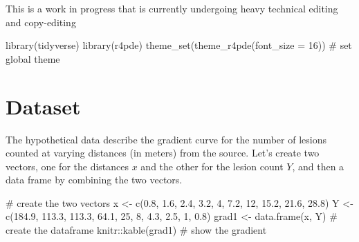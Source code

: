 \documentclass[
  letterpaper,
]{book}
\newenvironment{Shaded}{\begin{snugshade}}{\end{snugshade}}
\newcommand{\AttributeTok}[1]{\textcolor[rgb]{0.40,0.45,0.13}{#1}}
\newcommand{\CommentTok}[1]{\textcolor[rgb]{0.37,0.37,0.37}{#1}}
\newcommand{\DecValTok}[1]{\textcolor[rgb]{0.68,0.00,0.00}{#1}}
\newcommand{\FloatTok}[1]{\textcolor[rgb]{0.68,0.00,0.00}{#1}}
\newcommand{\FunctionTok}[1]{\textcolor[rgb]{0.28,0.35,0.67}{#1}}
\newcommand{\NormalTok}[1]{\textcolor[rgb]{0.00,0.23,0.31}{#1}}
\newcommand{\OtherTok}[1]{\textcolor[rgb]{0.00,0.23,0.31}{#1}}
\newcommand{\SpecialCharTok}[1]{\textcolor[rgb]{0.37,0.37,0.37}{#1}}
\begin{document}
\begin{tcolorbox}[enhanced jigsaw, bottomrule=.15mm, toprule=.15mm, breakable, arc=.35mm, rightrule=.15mm, leftrule=.75mm, colback=white, left=2mm, colframe=quarto-callout-note-color-frame, opacityback=0]
\begin{minipage}[t]{5.5mm}
\textcolor{quarto-callout-note-color}{\faInfo}
\end{minipage}%
\begin{minipage}[t]{\textwidth - 5.5mm}

This is a work in progress that is currently undergoing heavy technical
editing and copy-editing

\end{minipage}%
\end{tcolorbox}

\begin{Shaded}
\begin{Highlighting}[]
\FunctionTok{library}\NormalTok{(tidyverse)}
\FunctionTok{library}\NormalTok{(r4pde)}
\FunctionTok{theme\_set}\NormalTok{(}\FunctionTok{theme\_r4pde}\NormalTok{(}\AttributeTok{font\_size =} \DecValTok{16}\NormalTok{)) }\CommentTok{\# set global theme}
\end{Highlighting}
\end{Shaded}

\hypertarget{dataset}{%
\section{Dataset}\label{dataset}}

The hypothetical data describe the gradient curve for the number of
lesions counted at varying distances (in meters) from the source. Let's
create two vectors, one for the distances \(x\) and the other for the
lesion count \(Y\), and then a data frame by combining the two vectors.

\begin{Shaded}
\begin{Highlighting}[]
\CommentTok{\# create the two vectors}
\NormalTok{x }\OtherTok{\textless{}{-}} \FunctionTok{c}\NormalTok{(}\FloatTok{0.8}\NormalTok{, }\FloatTok{1.6}\NormalTok{, }\FloatTok{2.4}\NormalTok{, }\FloatTok{3.2}\NormalTok{, }\DecValTok{4}\NormalTok{, }\FloatTok{7.2}\NormalTok{, }\DecValTok{12}\NormalTok{, }\FloatTok{15.2}\NormalTok{, }\FloatTok{21.6}\NormalTok{, }\FloatTok{28.8}\NormalTok{)}
\NormalTok{Y }\OtherTok{\textless{}{-}} \FunctionTok{c}\NormalTok{(}\FloatTok{184.9}\NormalTok{, }\FloatTok{113.3}\NormalTok{, }\FloatTok{113.3}\NormalTok{, }\FloatTok{64.1}\NormalTok{, }\DecValTok{25}\NormalTok{, }\DecValTok{8}\NormalTok{, }\FloatTok{4.3}\NormalTok{, }\FloatTok{2.5}\NormalTok{, }\DecValTok{1}\NormalTok{, }\FloatTok{0.8}\NormalTok{)}
\NormalTok{grad1 }\OtherTok{\textless{}{-}} \FunctionTok{data.frame}\NormalTok{(x, Y) }\CommentTok{\# create the dataframe}
\NormalTok{knitr}\SpecialCharTok{::}\FunctionTok{kable}\NormalTok{(grad1) }\CommentTok{\# show the gradient}
\end{Highlighting}
\end{Shaded}
\end{document}

